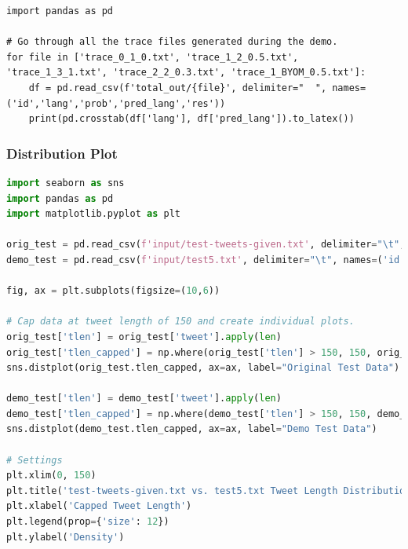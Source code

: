 \documentclass[runningheads]{llncs}
\begin{document}
\begin{lstlisting}[breaklines]
import pandas as pd

# Go through all the trace files generated during the demo.
for file in ['trace_0_1_0.txt', 'trace_1_2_0.5.txt', 'trace_1_3_1.txt', 'trace_2_2_0.3.txt', 'trace_1_BYOM_0.5.txt']:
    df = pd.read_csv(f'total_out/{file}', delimiter="  ", names=('id','lang','prob','pred_lang','res'))
    print(pd.crosstab(df['lang'], df['pred_lang']).to_latex())
\end{lstlisting}

\subsubsection{Distribution Plot}


\begin{lstlisting}[breaklines, language=Python]
import seaborn as sns
import pandas as pd
import matplotlib.pyplot as plt

orig_test = pd.read_csv(f'input/test-tweets-given.txt', delimiter="\t", names=('id','user','lang','tweet'))
demo_test = pd.read_csv(f'input/test5.txt', delimiter="\t", names=('id','user','lang','tweet'))

fig, ax = plt.subplots(figsize=(10,6))

# Cap data at tweet length of 150 and create individual plots.
orig_test['tlen'] = orig_test['tweet'].apply(len)
orig_test['tlen_capped'] = np.where(orig_test['tlen'] > 150, 150, orig_test['tlen'])
sns.distplot(orig_test.tlen_capped, ax=ax, label="Original Test Data")

demo_test['tlen'] = demo_test['tweet'].apply(len)
demo_test['tlen_capped'] = np.where(demo_test['tlen'] > 150, 150, demo_test['tlen'])
sns.distplot(demo_test.tlen_capped, ax=ax, label="Demo Test Data")

# Settings
plt.xlim(0, 150)
plt.title('test-tweets-given.txt vs. test5.txt Tweet Length Distribution')
plt.xlabel('Capped Tweet Length')
plt.legend(prop={'size': 12})
plt.ylabel('Density')
\end{lstlisting}
\end{document}
